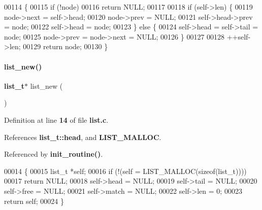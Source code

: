 \begin{DoxyCode}
00114                                                          \{
00115   \textcolor{keywordflow}{if} (!node)
00116     \textcolor{keywordflow}{return} NULL;
00117 
00118   \textcolor{keywordflow}{if} (self->len) \{
00119     node->next = \textcolor{keyword}{self}->head;
00120     node->prev = NULL;
00121     \textcolor{keyword}{self}->head->prev = node;
00122     \textcolor{keyword}{self}->head = node;
00123   \} \textcolor{keywordflow}{else} \{
00124     \textcolor{keyword}{self}->head = \textcolor{keyword}{self}->tail = node;
00125     node->prev = node->next = NULL;
00126   \}
00127 
00128   ++\textcolor{keyword}{self}->len;
00129   \textcolor{keywordflow}{return} node;
00130 \}
\end{DoxyCode}
\mbox{\label{a00029_a9dd3eafdb56dcc64689f78fb4acdff3f}} 
\paragraph{list\+\_\+new()}
{\footnotesize\ttfamily \textbf{ list\+\_\+t}$\ast$ list\+\_\+new (\begin{DoxyParamCaption}{ }\end{DoxyParamCaption})}



Definition at line \textbf{ 14} of file \textbf{ list.\+c}.



References \textbf{ list\+\_\+t\+::head}, and \textbf{ L\+I\+S\+T\+\_\+\+M\+A\+L\+L\+OC}.



Referenced by \textbf{ init\+\_\+routine()}.


\begin{DoxyCode}
00014                    \{
00015   list_t *\textcolor{keyword}{self};
00016   \textcolor{keywordflow}{if} (!(\textcolor{keyword}{self} = LIST_MALLOC(\textcolor{keyword}{sizeof}(list_t))))
00017     \textcolor{keywordflow}{return} NULL;
00018   \textcolor{keyword}{self}->head = NULL;
00019   \textcolor{keyword}{self}->tail = NULL;
00020   \textcolor{keyword}{self}->free = NULL;
00021   \textcolor{keyword}{self}->match = NULL;
00022   \textcolor{keyword}{self}->len = 0;
00023   \textcolor{keywordflow}{return} \textcolor{keyword}{self};
00024 \}
\end{DoxyCode}
\mbox{\label{a00029_a4ef36e0519514ac481d0d7e0b439d431}} 
